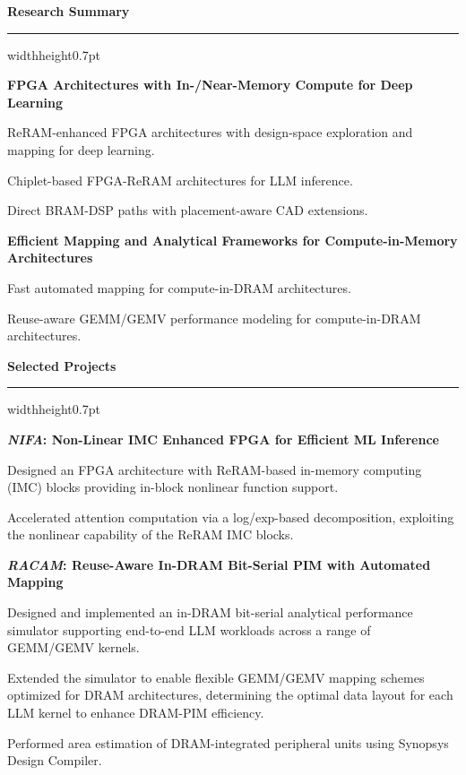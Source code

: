 \documentclass[10pt,letterpaper]{article}
\newcommand{\cvsection}[1]{%
  \vspace{3pt}\par\nopagebreak
  {\normalsize\bfseries\color{navy}#1\par}\vspace{1pt}\nopagebreak
  {\color{navy}\hrule width\linewidth height0.7pt}\nopagebreak
  \vspace{2pt}\nopagebreak}
\newenvironment{cvlist}{%
  \begin{list}{\textbullet}{%
    \setlength{\itemsep}{3pt}\setlength{\parsep}{0pt}%
    \setlength{\topsep}{0pt}\setlength{\partopsep}{0pt}%
    \setlength{\leftmargin}{1.2em}\setlength{\labelwidth}{0.7em}%
    \setlength{\labelsep}{0.5em}}}%
  {\end{list}}
\begin{document}
\cvsection{Research Summary}

\textbf{FPGA Architectures with In-/Near-Memory Compute for Deep Learning}
\begin{cvlist}
  \item ReRAM-enhanced FPGA architectures with design-space exploration and mapping for deep learning.
  \item Chiplet-based FPGA-ReRAM architectures for LLM inference.
  \item Direct BRAM-DSP paths with placement-aware CAD extensions.
\end{cvlist}

\textbf{Efficient Mapping and Analytical Frameworks for Compute-in-Memory Architectures}
\begin{cvlist}
  \item Fast automated mapping for compute-in-DRAM architectures.
  \item Reuse-aware GEMM/GEMV performance modeling for compute-in-DRAM architectures.
\end{cvlist}

\cvsection{Selected Projects}

\textbf{\emph{NIFA}: Non-Linear IMC Enhanced FPGA for Efficient ML Inference}
\begin{cvlist}
  \item Designed an FPGA architecture with ReRAM-based in-memory computing (IMC) blocks providing in-block nonlinear function support.
  \item Accelerated attention computation via a log/exp-based decomposition, exploiting the nonlinear capability of the ReRAM IMC blocks.
\end{cvlist}

\textbf{\emph{RACAM}: Reuse-Aware In-DRAM Bit-Serial PIM with Automated Mapping}
\begin{cvlist}
  \item Designed and implemented an in-DRAM bit-serial analytical performance simulator supporting end-to-end LLM workloads across a range of GEMM/GEMV kernels.
  \item Extended the simulator to enable flexible GEMM/GEMV mapping schemes optimized for DRAM architectures, determining the optimal data layout for each LLM kernel to enhance DRAM-PIM efficiency.
  \item Performed area estimation of DRAM-integrated peripheral units using Synopsys Design Compiler.
\end{cvlist}
\end{document}
